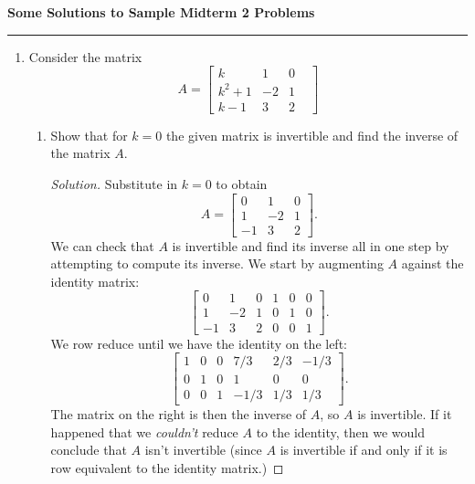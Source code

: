 \documentclass[11pt,letterpaper]{report}
\newenvironment{solution}
{\begin{proof}[Solution]}
{\end{proof}}
\begin{document}
\begin{center}
{\bf \Large Some Solutions to Sample Midterm 2 Problems} %
\vspace{0.2cm}
\hrule
\end{center}

\begin{enumerate}
	\item Consider the matrix
	\[
	A = \begin{bmatrix}
		k & 1 & 0 &\\
		k^2+1 & -2 & 1\\
		k-1 & 3 & 2
	\end{bmatrix}
	\]
	\begin{enumerate}
		\item Show that for $k=0$ the given matrix is invertible and find the inverse of the matrix $A$.
		\begin{solution}
			Substitute in $k=0$ to obtain
			\[
			A = \begin{bmatrix}
				0 & 1 & 0\\
				1 & -2 & 1\\
				-1 & 3 & 2
			\end{bmatrix}.
			\]
			We can check that $A$ is invertible and find its inverse all in one step by attempting to compute its inverse. We start by augmenting $A$ against the identity matrix:
			\[
			\left[
				\begin{array}{rrr|rrr}
					0 & 1 & 0 & 1 & 0 & 0\\
					1 & -2 & 1 & 0 & 1 & 0\\
					-1 & 3 & 2 & 0 & 0 & 1
				\end{array}
			\right].
			\]
			We row reduce until we have the identity on the left:
			\[
			\left[
				\begin{array}{rrr|rrr}
					1 & 0 & 0 & 7/3 & 2/3 & -1/3\\
					0 & 1 & 0 & 1 & 0 & 0\\
					0 & 0 & 1 &-1/3 & 1/3 & 1/3
				\end{array}
			\right].
			\]
			The matrix on the right is then the inverse of $A$, so $A$ is invertible. If it happened that we \textit{couldn't} reduce $A$ to the identity, then we would conclude that $A$ isn't invertible (since $A$ is invertible if and only if it is row equivalent to the identity matrix.)
		\end{solution}


\end{enumerate}
\end{enumerate}
\end{document}
